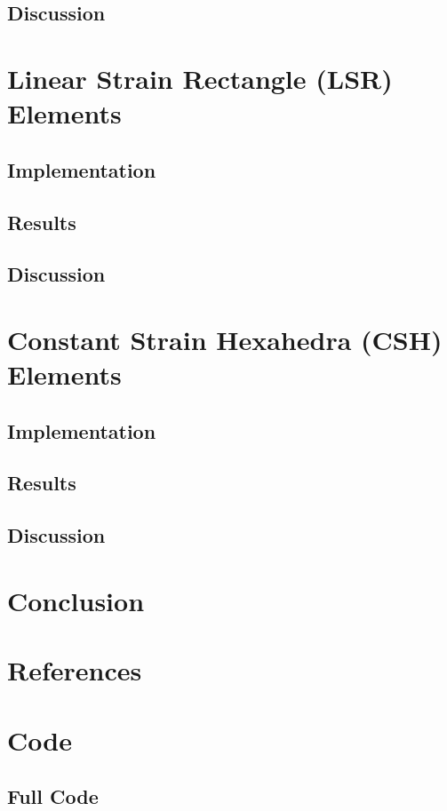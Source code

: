 \documentclass[12pt]{report}
\begin{document}
	\section{Discussion}
	
	\chapter{Linear Strain Rectangle (LSR) Elements}
	\section{Implementation}
	
	\section{Results}
	
	\section{Discussion}
	
	\chapter{Constant Strain Hexahedra (CSH) Elements}
	\section{Implementation}
	
	\section{Results}
	
	\section{Discussion}
	
	\chapter{Conclusion}
	
	\chapter{References}
	
	\appendix
	\chapter{Code}
	\section{Full Code}
	
\end{document}
